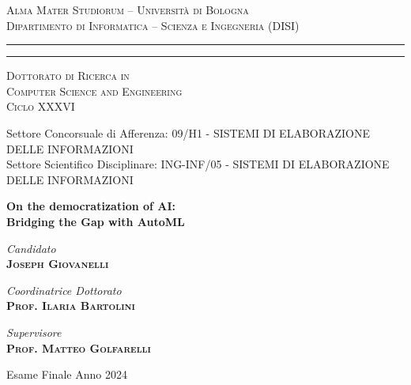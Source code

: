 \begin{titlepage}
%
%
\begin{center}
{{\Large{\textsc{Alma Mater Studiorum -- Università di Bologna}}\\\normalsize{\textsc{Dipartimento di Informatica -- Scienza e Ingegneria (DISI)}}}}
\rule[0.1cm]{15.8cm}{0.1mm}
\rule[0.5cm]{15.8cm}{0.6mm}
{\large{\textsc {Dottorato di Ricerca in\\Computer Science and Engineering}}\\
\vspace{3mm}
\normalsize{\textsc {Ciclo XXXVI}}}
\end{center}
%
\vspace{7mm}
%
%
\begin{footnotesize}
\centering
Settore Concorsuale di Afferenza: 09/H1 - SISTEMI DI ELABORAZIONE DELLE INFORMAZIONI\\
Settore Scientifico Disciplinare: ING-INF/05 - SISTEMI DI ELABORAZIONE DELLE INFORMAZIONI
\end{footnotesize}
%
\vfill
%
%
\begin{center}
{\LARGE\textbf{On the democratization of AI:}\\\vskip 1pt
\Large\textbf{Bridging the Gap with AutoML}}
\end{center}
%
\vfill
%
%
\begin{center}
{\large{\emph{Candidato}}\\
{\bf \textsc{Joseph Giovanelli}}}
\end{center}
%
\vskip 16pt
%
%
\begin{minipage}[t]{0.47\textwidth}
{\large{\emph{Coordinatrice Dottorato}}\\
{\bf \textsc{Prof. Ilaria Bartolini}}}
\end{minipage}
\hfill
\begin{minipage}[t]{0.47\textwidth}\raggedleft
{\large{\emph{Supervisore}}\\
{\bf \textsc{Prof. Matteo Golfarelli}}}
\end{minipage}
%
\vfill
%
%
\begin{center}
{\large{\sc Esame Finale Anno 2024}}
\end{center}
%
\clearemptydoublepage

\end{titlepage}